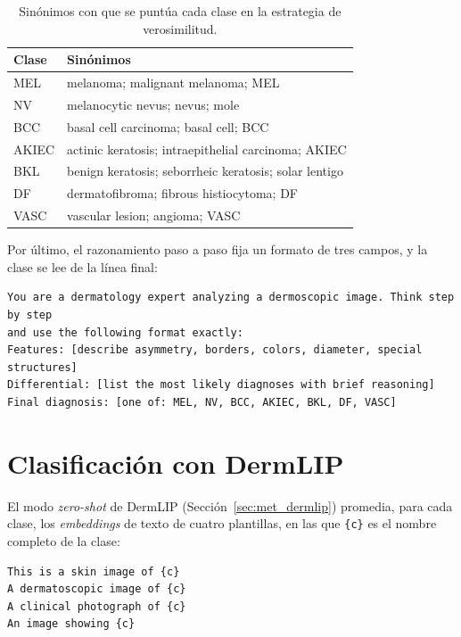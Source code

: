 \begin{table}[H]
    \centering
    \caption{Sinónimos con que se puntúa cada clase en la estrategia de verosimilitud.}
    \label{tab:ap_sinonimos}
    \small
    \begin{tabularx}{\textwidth}{@{}>{\raggedright\arraybackslash}p{2.2cm}>{\raggedright\arraybackslash}X@{}}
        \toprule
        \textbf{Clase} & \textbf{Sinónimos} \\
        \midrule
        MEL & melanoma; malignant melanoma; MEL \\
        \filasep
        NV & melanocytic nevus; nevus; mole \\
        \filasep
        BCC & basal cell carcinoma; basal cell; BCC \\
        \filasep
        AKIEC & actinic keratosis; intraepithelial carcinoma; AKIEC \\
        \filasep
        BKL & benign keratosis; seborrheic keratosis; solar lentigo \\
        \filasep
        DF & dermatofibroma; fibrous histiocytoma; DF \\
        \filasep
        VASC & vascular lesion; angioma; VASC \\
        \bottomrule
    \end{tabularx}
\end{table}

Por último, el razonamiento paso a paso fija un formato de tres campos, y la clase se lee de la línea final:
\begin{verbatim}
You are a dermatology expert analyzing a dermoscopic image. Think step by step
and use the following format exactly:
Features: [describe asymmetry, borders, colors, diameter, special structures]
Differential: [list the most likely diagnoses with brief reasoning]
Final diagnosis: [one of: MEL, NV, BCC, AKIEC, BKL, DF, VASC]
\end{verbatim}

\section{Clasificación con DermLIP}

El modo \emph{zero-shot} de DermLIP (Sección~\ref{sec:met_dermlip}) promedia, para cada clase, los
\emph{embeddings} de texto de cuatro plantillas, en las que \texttt{\{c\}} es el nombre completo de la clase:
\begin{verbatim}
This is a skin image of {c}
A dermatoscopic image of {c}
A clinical photograph of {c}
An image showing {c}
\end{verbatim}

